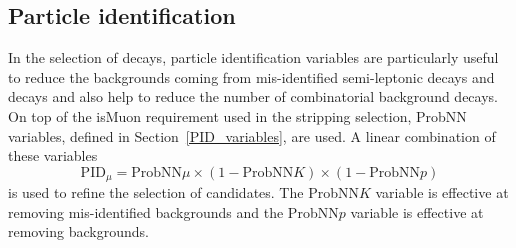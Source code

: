 %




\subsection{Particle identification}
\label{sec:BFpid}

In the selection of \bmumu decays, particle identification variables are particularly useful to reduce the backgrounds coming from mis-identified semi-leptonic decays and \bhh decays and also help to reduce the number of combinatorial background decays. On top of the isMuon requirement used in the stripping selection, ProbNN variables, defined in Section~\ref{PID_variables}, are used. A linear combination of these variables
\begin{equation}
\text{PID}_{\mu} = \text{ProbNN}\mu \times(1 -  \text{ProbNN}K)  \times(1 -  \text{ProbNN}p) 
\end{equation}
is used to refine the selection of \bmumu candidates. The ProbNN$K$ variable is effective at removing mis-identified \bhh backgrounds and the ProbNN$p$ variable is effective at removing \lambdab backgrounds. 


